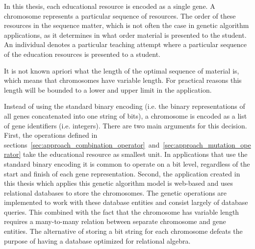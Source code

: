 In this thesis, each educational resource is encoded as a single gene. A
chromosome represents a particular sequence of resources. The order of these
resources in the sequence matter, which is not often the case in genetic
algorithm applications, as it determines in what order material is presented to
the student. An individual denotes a particular teaching attempt where a particular
sequence of the education resources is presented to a student.

It is not known apriori what the length of the optimal sequence of material is,
which means that chromosomes have variable length. For practical reasons this
length will be bounded to a lower and upper limit in the application. 

Instead of using the standard binary encoding (i.e. the binary representations
of all genes concatenated into one string of bits), a chromosome is encoded as a list
of gene identifiers (i.e. integers). There are two main arguments for this decision.
First, the operations defined in sections~\ref{sec:approach_combination_operator}~and~\ref{sec:approach_mutation_operator}
take the educational resource as smallest unit. In applications that use the
standard binary encoding it is common to operate on a bit level, regardless of
the start and finish of each gene representation. Second, the application
created in this thesis which applies this genetic algorithm model is web-based
and uses relational databases to store the chromosomes. The genetic operations
are implemented to work with these database entities and consist largely of
database queries. This combined with the fact that the chromosome has variable
length requires a many-to-many relation between separate chromosome and gene
entities. The alternative of storing a bit string for each chromosome defeats
the purpose of having a database optimized for relational algebra.


